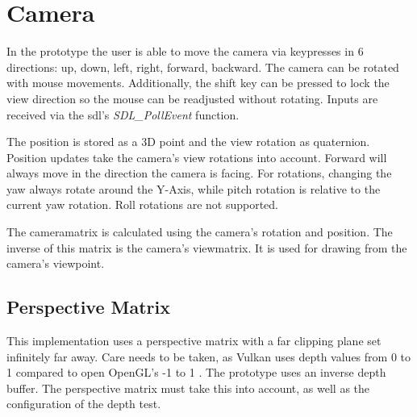 








\section{Camera}
In the prototype the user is able to move the camera via keypresses in 6 directions: up, down, left, right, forward, backward. The camera can be rotated with mouse movements. Additionally, the shift key can be pressed to lock the view direction so the mouse can be readjusted without rotating. Inputs are received via the \gls{sdl}'s \cite{sdl} \textit{SDL\_PollEvent} function.

The position is stored as a 3D point and the view rotation as quaternion. Position updates take the camera's view rotations into account. Forward will always move in the direction the camera is facing. For rotations, changing the yaw always rotate around the Y-Axis, while pitch rotation is relative to the current yaw rotation. Roll rotations are not supported.

The \gls{cameramatrix} is calculated using the camera's rotation and position. The inverse of this matrix is the camera's \gls{viewmatrix}. It is used for drawing from the camera's viewpoint.

\subsection{Perspective Matrix}
This implementation uses a perspective matrix with a far clipping plane set infinitely far away. Care needs to be taken, as Vulkan uses depth values from 0 to 1 \cite{khronos:vulkan:spec1.1} compared to open OpenGL's -1 to 1 \cite{khronos:openGL:spec4.6}. The prototype uses an inverse depth buffer. The perspective matrix must take this into account, as well as the configuration of the depth test.


